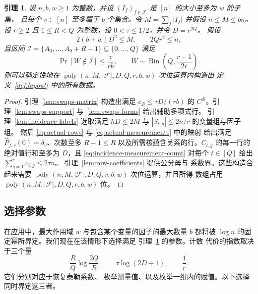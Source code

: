 \documentclass[11pt,reqno]{amsart}
\numberwithin{equation}{section}
\newtheorem{lemma}[theorem]{引理}
\theoremstyle{definition}\newtheorem{definition}[theorem]{定义}
\theoremstyle{remark}\newtheorem{remark}[theorem]{注}
\newcommand{\poly}{\operatorname{poly}}
\renewcommand{\le}{\leqslant}
\renewcommand{\ge}{\geqslant}
\begin{document}
\begin{lemma}\label{lem:layout}
设 $n,b,w\ge1$ 为整数，并设 $(I_f)_{f\in\mathcal F}$ 是 $[n]$ 的大小至多为 $w$ 的子集，
且每个 $v\in[n]$ 至多属于 $b$ 个集合。令
$M=\sum_f|I_f|$ 并假设 $n\le M\le bn$。设 $r\ge2$ 且
$1\le R<Q$ 为整数，设 $0<\tau\le1/2$，并令 $D=r^{2Q}$。
假设
\[
 2(b+w)D^2\le M,\qquad 2Qr^2\le n,
\]
且区间
$\mathcal I=\{A_0,\ldots,A_0+R-1\}\subseteq\{0,\ldots,Q\}$ 满足
\[
 \Pr[W\notin\mathcal I]\le\frac{\tau}{rb},\qquad
 W\sim\operatorname{Bin}\!\left(Q,\frac{r-1}{2r}\right).
\]
则可以确定性地在
$\poly(n,M,|\mathcal F|,D,Q,r,b,w)$ 次位运算内构造出
定义~\ref{def:layout} 中的所有数据。
\end{lemma}
\begin{proof}
引理~\ref{lem:swaps-matrix} 构造出满足
$c_{\mathcal B}\le\tau D/(rb)$ 的 $C^{\mathcal B}$。引理~\ref{lem:swaps-support}
与~\ref{lem:swaps-forms} 给出辅助多项式行。
引理~\ref{lem:incidence-labels} 选取满足 $hD\le2M$ 与 $|S_{t,g}|\le2n/r$ 的变量组与因子组。
然后 \eqref{eq:actual-rows} 与 \eqref{eq:actual-measurements} 中的映射
给出满足 $\vec{P}_{f,v}(0)=\delta_v$、次数至多 $R-1\le R$
以及所需核蕴含关系的行。$C_{t,g}$ 的每一行的
绝对值行和至多为 $D$，且 \eqref{eq:incidence-measurement-count}
对每个 $t\in[Q]$ 给出 $\sum_{g=1}^r c_{t,g}\le2\tau n$。
引理~\ref{lem:row-coefficients} 提供公分母与
系数界。这些构造合起来需要
$\poly(n,M,|\mathcal F|,D,Q,r,b,w)$ 次位运算，并且所得
数组占用 $\poly(n,M,|\mathcal F|,D,Q,r,b,w)$ 位。
\end{proof}

\subsection{选择参数}\label{subsec:incidence-parameters}
在应用中，最大作用域 $w$ 与包含某个变量的因子的最大数量
$b$ 都将被 $\log n$ 的固定幂所界定。我们现在在该情形下选择满足
引理~\ref{lem:layout} 的参数。计数
代价的指数取决于三个量
\[
 \frac RQ\log\frac{2Q}{R},\qquad
 \tau\log(2D+1),\qquad \frac1r.
\]
它们分别对应于恢复泰勒系数、
枚举测量值、以及枚举一组内的赋值。以下选择同时界定这三者。
\end{document}
